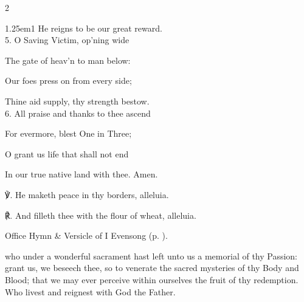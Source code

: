 \begin{paracol}{2}
\begin{hangparas}{1.25em}{1}
He reigns to be our great reward.\\

5. O Saving Victim, op'ning wide

The gate of heav'n to man below:

Our foes press on from every side;

Thine aid supply, thy strength bestow.\\

6. All praise and thanks to thee ascend

For evermore, blest One in Three;

O grant us life that shall not end

In our true native land with thee. Amen.\\
\end{hangparas}

℣. He maketh peace in thy borders, alleluia.

℟. And filleth thee with the flour of wheat, alleluia.

\end{paracol}

\secondEvensong
{}

\begin{rubric}
	Office Hymn \& Versicle of I Evensong (p. \pageref{CorpusChristiEvensongHymn}).
\end{rubric}


\collect\label{CorpusChristiCollect}
 who under a wonderful sacrament hast left unto us a memorial of thy Passion: grant us, we beseech thee, so to venerate the sacred mysteries of thy Body and Blood; that we may ever perceive within ourselves the fruit of thy redemption. Who livest and reignest with God the Father.


